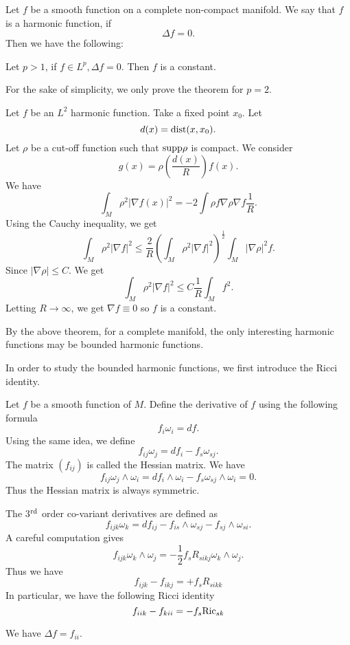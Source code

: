 Let $f$ be a smooth function on a complete non-compact manifold. We say that $f$ is a harmonic function, if 
%
\[ \Delta f = 0 .\]
Then we have the following:

\begin{theorem}[Yau] Let $ p > 1 $, if $ f \in L ^p , \Delta f = 0 $. Then $ f $ is a constant.
\end{theorem}
For the sake of simplicity, we only prove the theorem for $p = 2$.

Let $ f$ be an $ L^2 $ harmonic function. Take a fixed point $ x_0$. Let
%
\[ d (x) = {\rm dist} (x, x_0).\]
%
Let $ \rho $ be a cut-off function such that $ {\rm supp} \rho $ is compact. We consider 
%
\[ g (x) = \rho \left( \frac{d(x)}{R} \right) f (x) .\]
%
We have 
%
\[ \int_M \rho ^2 | \nabla f (x) |^2 = - 2 \int \rho f \nabla \rho \nabla f \frac{1}{R}.\]
%
Using the Cauchy inequality, we get 
%
\[ \int_M \rho^2 | \nabla f | ^2 \leq \frac{2}{R} \left( \int_M \rho^2 |\nabla f|^2 \right) ^{\frac{1}{2}} \int_M |\nabla \rho| ^2 f .\]
%
Since $ | \nabla \rho | \leq C$. We get 
%
\[ \int_M \rho^2 |\nabla f | ^2 \leq C \frac{1}{R} \int_M f^2.\]
%
Letting $R\rightarrow \infty $, we get $ \nabla f  \equiv 0 $ so $f$ is a constant.

By the above theorem, for a complete manifold, the only interesting harmonic functions may be bounded harmonic functions.

In order to study the bounded harmonic functions, we first introduce the Ricci identity.

Let $ f$ be a smooth function of $M$. Define the derivative of $f$ using the following formula 
%
\[ f_i \omega _i = df. \]
%
Using the same idea, we define 
%
\[ f_{ij} \omega _j = d f_i - f _s \omega _{s j} .\]
%
The matrix $ (f_{ij} )$ is called the Hessian matrix. We have 
%
\[ f_{ij} \omega _j \wedge \omega _i = d f _i \wedge \omega _i - f _s \omega _{s j} \wedge \omega _i = 0 .\]
%
Thus the Hessian matrix is always symmetric.

The 3$^{\rm rd}$ order co-variant derivatives are defined as 
%
\[ f_{ijk} \omega _k = d f _{ij} - f _{is} \wedge \omega  _{sj} - f  _{sj} \wedge \omega _{si} .\]
%
A careful computation gives 
%
\[f_{ijk} \omega _k   \wedge \omega  _{j}= - \frac{1}{2}f_s   R_{si kj}   \omega _k \wedge \omega _j.\]
%
Thus we have
%
\[ f_{ijk} - f _{ikj} = + f _s R_{sikk} \]
In particular, we have the following Ricci identity
%
\[f_{iik} - f _{kii} = - f_s {\rm Ric} _{sk}\]

\begin{remark}
We have $ \Delta f = f _{ii} $.
\end{remark}

